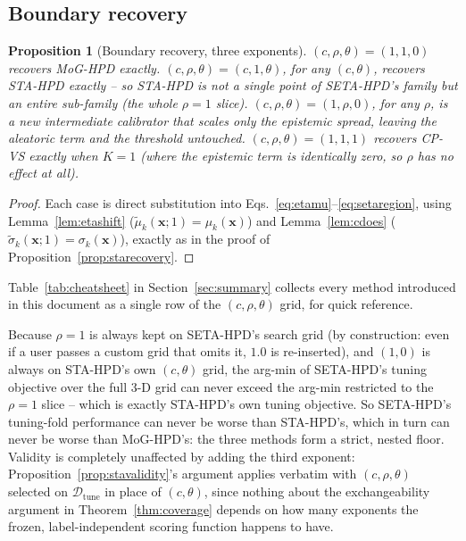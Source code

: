 \documentclass[11pt]{article}
\newtheorem{proposition}{Proposition}[section]
\begin{document}
\subsection{Boundary recovery}

\begin{proposition}[Boundary recovery, three exponents]
\label{prop:setarecovery}
$(c,\rho,\theta)=(1,1,0)$ recovers MoG-HPD exactly. $(c,\rho,\theta)=(c,1,\theta)$, for
\emph{any} $(c,\theta)$, recovers STA-HPD exactly -- so STA-HPD is not a single point of
SETA-HPD's family but an entire sub-family (the whole $\rho=1$ slice). $(c,\rho,\theta)=(1,\rho,0)$,
for any $\rho$, is a new intermediate calibrator that scales only the epistemic spread, leaving the
aleatoric term and the threshold untouched. $(c,\rho,\theta)=(1,1,1)$ recovers CP-VS exactly when
$K=1$ (where the epistemic term is identically zero, so $\rho$ has no effect at all).
\end{proposition}
\begin{proof}
Each case is direct substitution into Eqs.~\eqref{eq:etamu}--\eqref{eq:setaregion}, using
Lemma~\ref{lem:etashift} ($\tilde\mu_k(\bm x;1)=\mu_k(\bm x)$) and Lemma~\ref{lem:cdoes}
($\tilde\sigma_k(\bm x;1)=\sigma_k(\bm x)$), exactly as in the proof of
Proposition~\ref{prop:starecovery}.
\end{proof}

Table~\ref{tab:cheatsheet} in Section~\ref{sec:summary} collects every method introduced in this
document as a single row of the $(c,\rho,\theta)$ grid, for quick reference.

Because $\rho=1$ is always kept on SETA-HPD's search grid (by construction: even if a user passes
a custom grid that omits it, $1.0$ is re-inserted), and $(1,0)$ is always on STA-HPD's own
$(c,\theta)$ grid, the arg-min of SETA-HPD's tuning objective over the full 3-D grid can never
exceed the arg-min restricted to the $\rho=1$ slice -- which is exactly STA-HPD's own tuning
objective. So SETA-HPD's tuning-fold performance can never be worse than STA-HPD's, which in turn
can never be worse than MoG-HPD's: the three methods form a strict, nested floor. Validity is
completely unaffected by adding the third exponent: Proposition~\ref{prop:stavalidity}'s argument
applies verbatim with $(c,\rho,\theta)$ selected on $\mathcal D_{\mathrm{tune}}$ in place of
$(c,\theta)$, since nothing about the exchangeability argument in Theorem~\ref{thm:coverage}
depends on how many exponents the frozen, label-independent scoring function happens to have.
\end{document}
